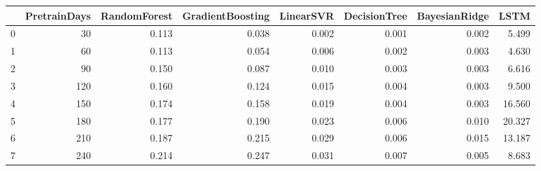 \begin{tabular}{lrrrrrrr}
\toprule
{} &  PretrainDays &  RandomForest &  GradientBoosting &  LinearSVR &  DecisionTree &  BayesianRidge &   LSTM \\
\midrule
0 &            30 &         0.113 &             0.038 &      0.002 &         0.001 &          0.002 &  5.499 \\
1 &            60 &         0.113 &             0.054 &      0.006 &         0.002 &          0.003 &  4.630 \\
2 &            90 &         0.150 &             0.087 &      0.010 &         0.003 &          0.003 &  6.616 \\
3 &           120 &         0.160 &             0.124 &      0.015 &         0.004 &          0.003 &  9.500 \\
4 &           150 &         0.174 &             0.158 &      0.019 &         0.004 &          0.003 & 16.560 \\
5 &           180 &         0.177 &             0.190 &      0.023 &         0.006 &          0.010 & 20.327 \\
6 &           210 &         0.187 &             0.215 &      0.029 &         0.006 &          0.015 & 13.187 \\
7 &           240 &         0.214 &             0.247 &      0.031 &         0.007 &          0.005 &  8.683 \\
\bottomrule
\end{tabular}
